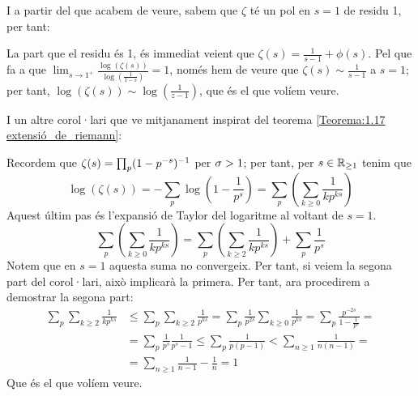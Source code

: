 I a partir del que acabem de veure, sabem que $\zeta$ té un pol en $s=1$ de residu 1, per tant:
\begin{pf}
    La part que el residu és 1, és immediat veient que $\zeta(s)=\frac{1}{s-1}+\phi(s)$. Pel que fa a que $\lim_{s\rightarrow1^+}\frac{\log(\zeta(s))}{\log(\frac{1}{1-s})}=1$, només hem de veure que $\zeta(s)\sim \frac{1}{s-1}$ a $s=1$; per tant, $\log(\zeta(s))\sim\log(\frac{1}{z-1})$, que és el que volíem veure.
\end{pf}
I un altre corol·lari que ve mitjanament inspirat del teorema \ref{Teorema:1.17 extensió_de_riemann}:
\begin{pf}
    Recordem que $\zeta(s)=\prod_p(1-p^{-s})^{-1}$ per $\sigma>1$; per tant, per $s\in\mathbb R_{\geq1}$ tenim que
    \[
    \log(\zeta(s))=-\sum_p\log\left(1-\frac{1}{p^s}\right)=\sum_p\left(\sum_{k\geq0}\frac{1}{kp^{ks}}\right)
    \]
    Aquest últim pas és l'expansió de Taylor del logaritme al voltant de $s=1$.
    \[
    \sum_p\left(\sum_{k\geq0}\frac{1}{kp^{ks}}\right)=\sum_p\left(\sum_{k\geq2}\frac{1}{kp^{ks}}\right)+\sum_p\frac{1}{p^s}
    \]
    Notem que en $s=1$ aquesta suma no convergeix. Per tant, si veiem la segona part del corol·lari, això implicarà la primera. Per tant, ara procedirem a demostrar la segona part:
    \begin{align*}
        \sum_p\sum_{k\geq2}\frac{1}{kp^{ks}}&\leq\sum_p\sum_{k\geq2}\frac{1}{p^{ks}}=\sum_{p}\frac{1}{p^{2s}}\sum_{k\geq0}\frac{1}{p^{ks}}=\sum_p\frac{p^{-2s}}{1-\frac{1}{p^s}}=\\
        &=\sum_p\frac{1}{p^s}\frac{1}{p^{s}-1}\leq\sum_p\frac{1}{p(p-1)}<\sum_{n\geq1}\frac{1}{n(n-1)}=\\
        &=\sum_{n\geq1}\frac{1}{n-1}-\frac{1}{n}=1
    \end{align*}
    Que és el que volíem veure.
\end{pf}